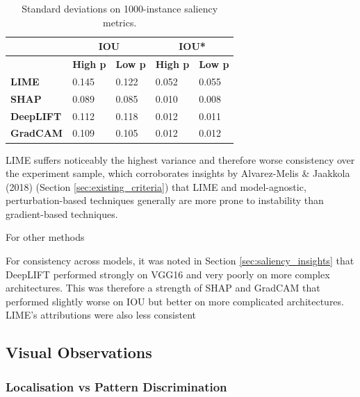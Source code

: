 \documentclass[main]{subfiles}
\begin{document}
\begin{table}[htbp]
\centering
\begin{tabular}{|l|l|l|l|l|}
\hline
                  & \multicolumn{2}{c|}{\textbf{IOU}} & \multicolumn{2}{c|}{\textbf{IOU*}} \\ \hline
                  & \textbf{High p}           & \textbf{Low p}          & \textbf{High p}           & \textbf{Low p}           \\ \hline
\textbf{LIME}     & 0.145            & 0.122          & 0.052            & 0.055           \\ \hline
\textbf{SHAP}     & 0.089            & 0.085          & 0.010            & 0.008           \\ \hline
\textbf{DeepLIFT} & 0.112            & 0.118          & 0.012            & 0.011           \\ \hline
\textbf{GradCAM}  & 0.109            & 0.105          & 0.012            & 0.012           \\ \hline
\end{tabular}

\caption{Standard deviations on 1000-instance saliency metrics.}
\label{consistencytable}

\end{table}

LIME suffers noticeably the highest variance and therefore worse consistency over the experiment sample, which corroborates insights by Alvarez-Melis \& Jaakkola (2018) (Section \ref{sec:existing_criteria}) that LIME and model-agnostic, perturbation-based techniques generally are more prone to instability than gradient-based techniques. 

For other methods


For consistency across models, it was noted in Section \ref{sec:saliency_insights} that DeepLIFT performed strongly on VGG16 and very poorly on more complex architectures. This was therefore a strength of SHAP and GradCAM that performed slightly worse on IOU but better on more complicated architectures. LIME's attributions were also less consistent

\newpage
\subsection{Visual Observations}

\subsubsection{Localisation vs Pattern Discrimination}
\end{document}
